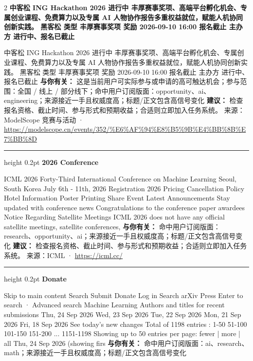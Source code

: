 \documentclass[10.5pt]{ctexart}
\begin{document}
\begin{multicols}{2}
{\large\bfseries 中客松 ING Hackathon 2026 进行中 丰厚赛事奖项、高端平台孵化机会、专属创业课程、免费算力以及专属 AI 人物协作报告多重权益就位，赋能人机协同创新实践。 黑客松 类型 丰厚赛事奖项 奖励 2026-09-10 16:00 报名截止 主办方 进行中、报名已截止}\par
中客松 ING Hackathon 2026 进行中 丰厚赛事奖项、高端平台孵化机会、专属创业课程、免费算力以及专属 AI 人物协作报告多重权益就位，赋能人机协同创新实践。 黑客松 类型 丰厚赛事奖项 奖励 2026-09-10 16:00 报名截止 主办方 进行中、报名已截止
\textbf{与你有关：} 这是当前用户可实际参与或申请的高可触达机会；参与范围：全国 / 线上 / 部分线下；命中用户订阅版面：opportunity、ai、engineering；来源接近一手且权威度高；标题/正文包含高信号变化
\textbf{建议：} 检查报名资格、截止时间、参与形式和预期收益；合适则立即加入任务系统。
{\footnotesize\color{ormuted} 来源：ModelScope 竞赛与活动 · \url{https://modelscope.cn/events/352/%E6%AF%94%E8%B5%9B%E4%BB%8B%E7%BB%8D}}
\vspace{2mm}
\hrule height 0.2pt
\vspace{2mm}
{\large\bfseries 2026 Conference}\par
ICML 2026 Forty-Third International Conference on Machine Learning Seoul, South Korea July 6th - 11th, 2026 Registration 2026 Pricing Cancellation Policy Hotel Information Poster Printing Share Event Latest Announcements Stay updated with conference news Congratulations to the conference paper awardees Notice Regarding Satellite Meetings ICML 2026 does not have any official satellite meetings, satellite conferences, 
\textbf{与你有关：} 命中用户订阅版面：research、opportunity、ai；来源接近一手且权威度高；标题/正文包含高信号变化
\textbf{建议：} 检查报名资格、截止时间、参与形式和预期收益；合适则立即加入任务系统。
{\footnotesize\color{ormuted} 来源：ICML · \url{https://icml.cc/}}
\vspace{2mm}
\hrule height 0.2pt
\vspace{2mm}
{\large\bfseries Donate}\par
Skip to main content Search Submit Donate Log in Search arXiv Press Enter to search · Advanced search Machine Learning Authors and titles for recent submissions Thu, 24 Sep 2026 Wed, 23 Sep 2026 Tue, 22 Sep 2026 Mon, 21 Sep 2026 Fri, 18 Sep 2026 See today's new changes Total of 1198 entries : 1-50 51-100 101-150 151-200 ... 1151-1198 Showing up to 50 entries per page: fewer | more | all Thu, 24 Sep 2026 (showing firs
\textbf{与你有关：} 命中用户订阅版面：ai、research、math；来源接近一手且权威度高；标题/正文包含高信号变化

\end{multicols}
\end{document}
